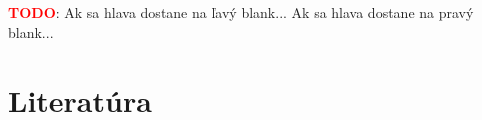 \documentclass[11pt,a4paper]{article}
\newcommand{\red}[1]{\textcolor{red}{#1}}
\begin{document}
\red{\textbf{TODO}}: Ak sa hlava dostane na ľavý blank... Ak sa hlava dostane na pravý blank...

\newpage
\section{Literatúra} %


\begin{flushleft}
    
\end{flushleft}
\end{document}
